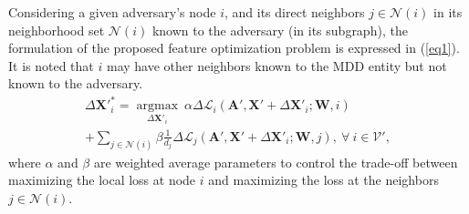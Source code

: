 \documentclass[conference,compsoc]{IEEEtran}
\begin{document}

\par Considering a given adversary's node $i$, and its direct neighbors $j \in \mathcal{N}(i)$ in its neighborhood set $\mathcal{N}(i)$ known to the adversary (in its subgraph), the formulation of the proposed feature optimization problem is expressed in (\ref{eq1}). It is noted that $i$ may have other neighbors known to the MDD entity but not known to the adversary.
\begin{multline}
\Delta \boldsymbol{X'}^*_i =\underset{\Delta \boldsymbol{X'}_i}{\operatorname{argmax}}~ \alpha\Delta \mathcal{L}_i\left(\boldsymbol{A'}, \boldsymbol{X'}+\Delta \boldsymbol{X'}_i ; \boldsymbol{W}, i\right)
\\+\sum_{j \in \mathcal{N}(i)} \beta \frac{1}{d_j} \Delta \mathcal{L}_j\left(\boldsymbol{A'}, \boldsymbol{X'}+\Delta \boldsymbol{X'}_i ; \boldsymbol{W}, j\right),~\forall~i \in \mathcal{V}',\label{eq1}
\end{multline}
\noindent where $\alpha$ and $\beta$ are weighted average parameters to control the trade-off between maximizing the local loss at node $i$ and maximizing the loss at the neighbors $j \in \mathcal{N}(i)$.


\end{document}

